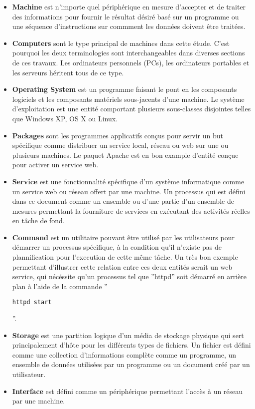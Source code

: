 \begin{itemize}
  \item \textbf{Machine} est n'importe quel périphérique en mesure d'accepter et
	  de traiter des informations pour fournir le résultat désiré basé sur
	  un programme ou une séquence d'instructions sur commment les données
	  doivent être traitées.
  \item \textbf{Computers} sont le type principal de machines dans cette étude.
	  C'est pourquoi les deux terminologies sont interchangeables dans
	  diverses sections de ces travaux. Les ordinateurs personnels (PCs),
	  les ordinateurs portables et les serveurs héritent tous de ce type.
  \item \textbf{Operating System} est un programme faisant le pont en les
	  composants logiciels et les composants matériels sous-jacents d'une
	  machine. Le système d'exploitation est une entité comportant plusieurs
	  sous-classes disjointes telles que Windows XP, OS X ou Linux.
  \item \textbf{Packages} sont les programmes applicatifs conçus pour servir un
	  but spécifique comme distribuer un service local, réseau ou web sur
	  une ou plusieurs machines. Le paquet Apache est en bon example
	  d'entité conçue pour activer un service web.
  \item \textbf{Service} est une fonctionnalité spécifique d'un système
	  informatique comme un service web ou réseau offert par une machine. Un
	  processus qui est défini dans ce document comme un ensemble ou d'une
	  partie d'un ensemble de mesures permettant la fourniture de services
	  en exécutant des activités réelles en tâche de fond.
  \item \textbf{Command} est un utilitaire pouvant être utilisé par les
	  utilisateurs pour démarrer un processus spécifique, à la condition
	  qu'il n'existe pas de plannification pour l'execution de cette même
	  tâche. Un très bon exemple permettant d'illustrer cette relation
	  entre ces deux entités serait un web service, qui nécéssite qu'un
	  processus tel que ''httpd'' soit démarré en arrière plan à l'aide de
	  la commande ''\begin{verbatim}httpd start\end{verbatim}''.
  \item \textbf{Storage} est une partition logique d'un média de stockage
	  physique qui sert principalement d'hôte pour les différents types de
	  fichiers. Un fichier est défini comme une collection d'informations
	  complète comme un programme, un ensemble de données utilisées par un
	  programme ou un document créé par un utilisateur.
  \item \textbf{Interface} est défini comme un périphérique permettant l'accès à
	  un réseau par une machine.
\end{itemize}

